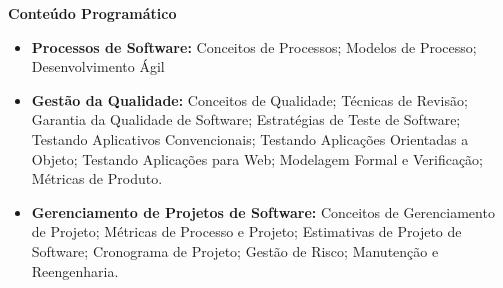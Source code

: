 \begin{snugshade}\begin{center}\textbf{
    Conteúdo Programático
}\end{center}\end{snugshade}

\begin{itemize}

 \item \textbf{Processos de Software:} Conceitos de Processos; Modelos de Processo; Desenvolvimento Ágil
 
  \item \textbf{Gestão da Qualidade:} Conceitos de Qualidade; Técnicas de Revisão; Garantia da Qualidade de Software; Estratégias de Teste de Software; Testando Aplicativos Convencionais; Testando Aplicações Orientadas a Objeto; Testando Aplicações para Web; Modelagem Formal e Verificação; Métricas de Produto.
 \item \textbf{Gerenciamento de Projetos de Software:}  Conceitos de Gerenciamento de Projeto; Métricas de Processo e Projeto; Estimativas de Projeto de Software; Cronograma de Projeto; Gestão de Risco; Manutenção e Reengenharia.

\end{itemize}







